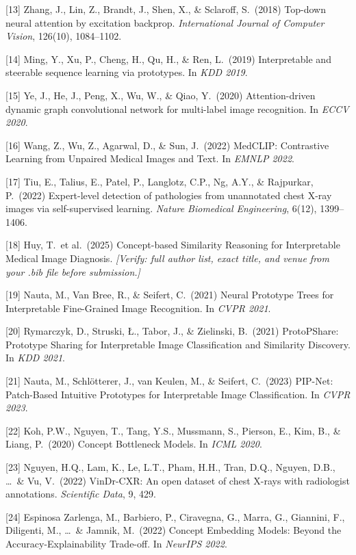 \documentclass{article}
\begin{document}
{[13] Zhang, J., Lin, Z., Brandt, J., Shen, X., \& Sclaroff, S.\ (2018) Top-down neural attention by excitation backprop. \textit{International Journal of Computer Vision}, 126(10), 1084--1102.

[14] Ming, Y., Xu, P., Cheng, H., Qu, H., \& Ren, L.\ (2019) Interpretable and steerable sequence learning via prototypes. In \textit{KDD 2019}.

[15] Ye, J., He, J., Peng, X., Wu, W., \& Qiao, Y.\ (2020) Attention-driven dynamic graph convolutional network for multi-label image recognition. In \textit{ECCV 2020}.

[16] Wang, Z., Wu, Z., Agarwal, D., \& Sun, J.\ (2022) MedCLIP: Contrastive Learning from Unpaired Medical Images and Text. In \textit{EMNLP 2022}.

[17] Tiu, E., Talius, E., Patel, P., Langlotz, C.P., Ng, A.Y., \& Rajpurkar, P.\ (2022) Expert-level detection of pathologies from unannotated chest X-ray images via self-supervised learning. \textit{Nature Biomedical Engineering}, 6(12), 1399--1406.

[18] Huy, T.\ et al.\ (2025) Concept-based Similarity Reasoning for Interpretable Medical Image Diagnosis. \textit{[Verify: full author list, exact title, and venue from your .bib file before submission.]}

[19] Nauta, M., Van Bree, R., \& Seifert, C.\ (2021) Neural Prototype Trees for Interpretable Fine-Grained Image Recognition. In \textit{CVPR 2021}.

[20] Rymarczyk, D., Struski, \L., Tabor, J., \& Zielinski, B.\ (2021) ProtoPShare: Prototype Sharing for Interpretable Image Classification and Similarity Discovery. In \textit{KDD 2021}.

[21] Nauta, M., Schl\"{o}tterer, J., van Keulen, M., \& Seifert, C.\ (2023) PIP-Net: Patch-Based Intuitive Prototypes for Interpretable Image Classification. In \textit{CVPR 2023}.

[22] Koh, P.W., Nguyen, T., Tang, Y.S., Mussmann, S., Pierson, E., Kim, B., \& Liang, P.\ (2020) Concept Bottleneck Models. In \textit{ICML 2020}.

[23] Nguyen, H.Q., Lam, K., Le, L.T., Pham, H.H., Tran, D.Q., Nguyen, D.B., \ldots\ \& Vu, V.\ (2022) VinDr-CXR: An open dataset of chest X-rays with radiologist annotations. \textit{Scientific Data}, 9, 429.

[24] Espinosa Zarlenga, M., Barbiero, P., Ciravegna, G., Marra, G., Giannini, F., Diligenti, M., \ldots\ \& Jamnik, M.\ (2022) Concept Embedding Models: Beyond the Accuracy-Explainability Trade-off. In \textit{NeurIPS 2022}.

}
\end{document}
